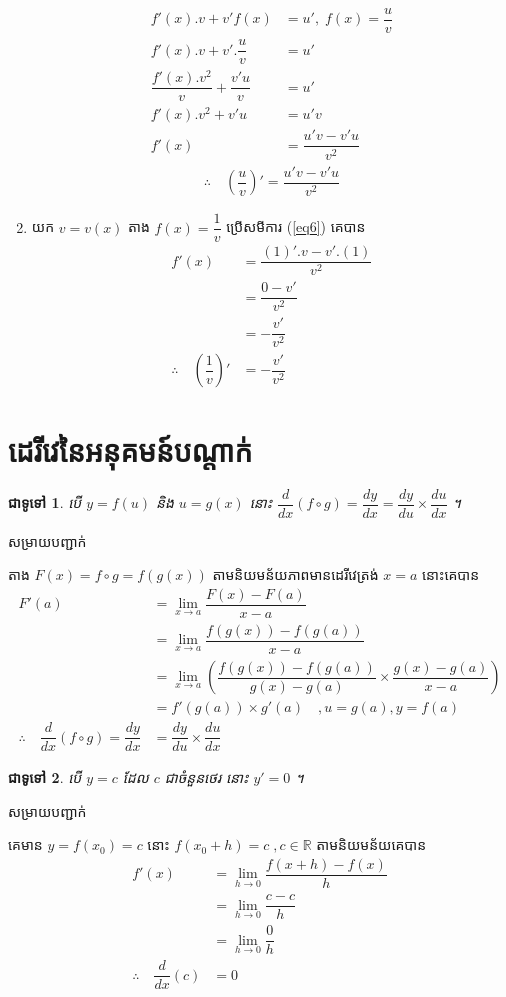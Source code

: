 \documentclass[12pt,fleqn]{book} %
\newtheorem{general}{\kml ជាទូទៅ}
\newcommand{\solution}{{\begin{center}\kml \color{magenta} សម្រាយបញ្ជាក់\end{center} }}
\newcommand{\R}{\mathbb{R}}
\begin{document}
\begin{enumerate}
\begin{align*}
f'(x).v+v'f(x)&=u' ,\; f(x)=\dfrac{u}{v}\\
f'(x).v+v'. \dfrac{u}{v}&=u'\\
\dfrac{f'(x).v^2}{v}+\dfrac{v'u}{v}&=u'\\
f'(x).v^2+v'u&=u'v\\
  f'(x)&=\dfrac{u'v-v'u}{v^2}
\end{align*}
\begin{align}\label{eq6}
\therefore\quad\left(\dfrac{u}{v}\right)'=\dfrac{u'v-v'u}{v^2}
\end{align}
\item យក $v=v(x)$ តាង $f(x)=\dfrac{1}{v}$ ប្រើសមីការ (\ref{eq6}) គេបាន 
\begin{align*}
f'(x)&=\dfrac{(1)'.v-v'.(1)}{v^2}\\
&=\dfrac{0-v'}{v^2}\\
&=-\dfrac{v'}{v^2}\\
\therefore \quad\left( \dfrac{1}{v}\right)'&=-\dfrac{v'}{v^2}
\end{align*}

 \end{enumerate}
 \section{ដេរីវេនៃអនុគមន៍បណ្តាក់}
 \begin{general}
 បើ $y=f(u)$ និង $u=g(x)$ នោះ $\dfrac{d}{dx}(f \circ g)=\dfrac{dy}{dx}=\dfrac{dy}{du}\times \dfrac{du}{dx}$  ។ 
 \end{general}
 \solution តាង $F(x)=f\circ g=f(g(x))$  តាមនិយមន័យភាពមានដេរីវេត្រង់ $x=a$ នោះគេបាន 
 \begin{align*}
 F'(a)&=\lim_{x\to a}\dfrac{F(x)-F(a)}{x-a}\\
 &=\lim _{x\to a}\dfrac{f(g(x))-f(g(a))}{x-a}\\
 &=\lim_{x\to a}\left( \dfrac{f(g(x))-f(g(a))}{g(x)-g(a)} \times \dfrac{g(x)-g(a)}{x-a}\right)\\
 &=f'(g(a))\times g'(a)\quad,u=g(a),y=f(a)\\
 \therefore \quad \dfrac{d}{dx}(f\circ g)=\dfrac{dy}{dx}&=\dfrac{dy}{du}\times \dfrac{du}{dx}
 \end{align*}
 
\begin{general}
បើ $y=c$ ដែល $c$ ជាចំនួនថេរ នោះ $y'=0$ ។  
\end{general}
\solution 
គេមាន $y=f(x_0)=c$ នោះ $f(x_0+h)=c \;, c\in \R$
តាមនិយមន័យគេបាន 
\begin{align*}
f'(x)&=\lim_{h\to 0}\dfrac{f(x+h)-f(x)}{h}\\
&=\lim_{h\to 0}\dfrac{c-c}{h}\\
&=\lim_{h\to 0}\dfrac{0}{h}\\
\therefore \quad \dfrac{d}{dx}(c)&=0
\end{align*}
\end{document}
